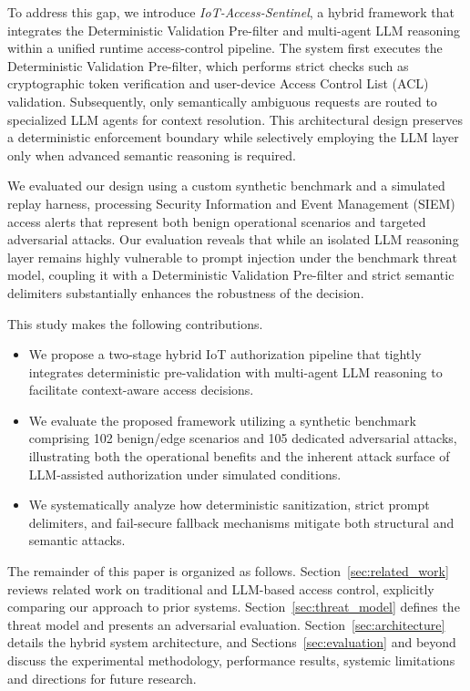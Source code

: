\documentclass[
]{ceurart}
\begin{document}
To address this gap, we introduce \textit{IoT-Access-Sentinel}, a hybrid framework that integrates the Deterministic Validation Pre-filter and multi-agent LLM reasoning within a unified runtime access-control pipeline. The system first executes the Deterministic Validation Pre-filter, which performs strict checks such as cryptographic token verification and user-device Access Control List (ACL) validation. Subsequently, only semantically ambiguous requests are routed to specialized LLM agents for context resolution. This architectural design preserves a deterministic enforcement boundary while selectively employing the LLM layer only when advanced semantic reasoning is required.

We evaluated our design using a custom synthetic benchmark and a simulated replay harness, processing Security Information and Event Management (SIEM) access alerts that represent both benign operational scenarios and targeted adversarial attacks. Our evaluation reveals that while an isolated LLM reasoning layer remains highly vulnerable to prompt injection under the benchmark threat model, coupling it with a Deterministic Validation Pre-filter and strict semantic delimiters substantially enhances the robustness of the decision.

This study makes the following contributions.

\begin{itemize}
    \item We propose a two-stage hybrid IoT authorization pipeline that tightly integrates deterministic pre-validation with multi-agent LLM reasoning to facilitate context-aware access decisions.
    \item We evaluate the proposed framework utilizing a synthetic benchmark comprising 102 benign/edge scenarios and 105 dedicated adversarial attacks, illustrating both the operational benefits and the inherent attack surface of LLM-assisted authorization under simulated conditions.
    \item We systematically analyze how deterministic sanitization, strict prompt delimiters, and fail-secure fallback mechanisms mitigate both structural and semantic attacks.
\end{itemize}

The remainder of this paper is organized as follows. Section~\ref{sec:related_work} reviews related work on traditional and LLM-based access control, explicitly comparing our approach to prior systems. Section~\ref{sec:threat_model} defines the threat model and presents an adversarial evaluation. Section~\ref{sec:architecture} details the hybrid system architecture, and Sections~\ref{sec:evaluation} and beyond discuss the experimental methodology, performance results, systemic limitations and directions for future research.
\end{document}
